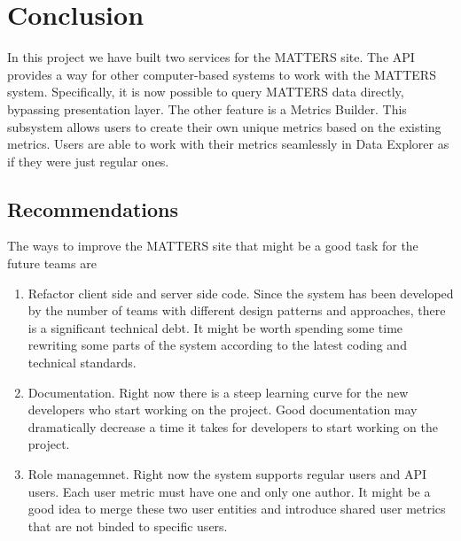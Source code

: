 \chapter{Conclusion}

	In this project we have built two services for the MATTERS site. The API 
	provides a way for other computer-based systems to work with the MATTERS 
	system. Specifically, it is now possible to query MATTERS data directly, 
	bypassing presentation layer. The other feature is a Metrics Builder. 
	This subsystem allows users to create their own unique metrics based on 
	the existing metrics. Users are able to work with their metrics seamlessly 
	in Data Explorer as if they were just regular ones.  

	\section{Recommendations}
		
		The ways to improve the MATTERS site that might be a good task for the 
		future teams are
		
		\begin{enumerate}
			\item
				Refactor client side and server side code. Since the system 
				has been developed by the number of teams with different design 
				patterns and approaches, there is a significant technical debt. 
				It might be worth spending some time rewriting some parts of the system 
				according to the latest coding and technical standards.
			\item
				Documentation. Right now there is a steep learning curve for the new 
				developers who start working on the project. Good documentation may 
				dramatically decrease a time it takes for developers to start working 
				on the project.
			\item
				Role managemnet. Right now the system supports regular users and API users. 
				Each user metric must have one and only one author. It might be a good idea 
				to merge these two user entities and introduce shared user metrics that are 
				not binded to specific users.
		\end{enumerate}
		